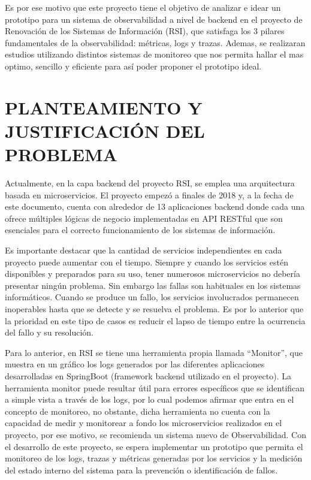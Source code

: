 \documentclass[a4paper,12pt]{article}
\begin{document}
\vspace{12pt}
Es por ese motivo que este proyecto tiene el objetivo de analizar e idear un prototipo para un sistema de observabilidad a nivel de backend en el proyecto de Renovación de los Sistemas de Información (RSI), que satisfaga los 3 pilares fundamentales de la observabilidad: métricas, logs y trazas. Ademas, se realizaran estudios utilizando distintos sistemas de monitoreo que nos permita hallar el mas optimo, sencillo y eficiente para así poder proponer el prototipo ideal.

\section{\large PLANTEAMIENTO Y JUSTIFICACIÓN DEL PROBLEMA}

Actualmente, en la capa backend del proyecto RSI, se emplea una arquitectura basada en microservicios. El proyecto empezó a finales de 2018 y, a la fecha de este documento, cuenta con alrededor de 13 aplicaciones backend donde cada una ofrece múltiples lógicas de negocio implementadas en API RESTful que son esenciales para el correcto funcionamiento de los sistemas de información.

\vspace{12pt}

Es importante destacar que la cantidad de servicios independientes en cada proyecto puede aumentar con el tiempo. Siempre y cuando los servicios estén disponibles y preparados para su uso, tener numerosos microservicios no debería presentar ningún problema. Sin embargo las fallas son habituales en los sistemas informáticos. Cuando se produce un fallo, los servicios involucrados permanecen inoperables hasta que se detecte y se resuelva el problema. Es por lo anterior que la prioridad en este tipo de casos es reducir el lapso de tiempo entre la ocurrencia del fallo y su resolución. 

\vspace{12pt}

Para lo anterior, en RSI se tiene una herramienta propia llamada “Monitor”, que muestra en un gráfico los logs generados por las diferentes aplicaciones desarrolladas en SpringBoot (framework backend utilizado en el proyecto). La herramienta monitor puede resultar útil para errores específicos que se identifican a simple vista a través de los logs, por lo cual podemos afirmar que entra en el concepto de monitoreo, no obstante, dicha herramienta no cuenta con la capacidad de medir y monitorear a fondo los microservicios realizados en el proyecto, por ese motivo, se recomienda un sistema nuevo de Observabilidad. Con el desarrollo de este proyecto, se espera implementar un prototipo que permita el monitoreo de los logs, trazas y métricas generadas por los servicios y la medición del estado interno del sistema para la prevención o identificación de fallos.
\end{document}
